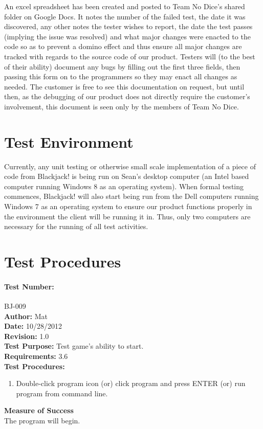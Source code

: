 \documentclass{article}
\begin{document}
An excel spreadsheet has been created and posted to Team No Dice’s shared folder on Google Docs.  It notes the number of the failed test, the date it was discovered, any other notes the tester wishes to report, the date the test passes (implying the issue was resolved) and what major changes were enacted to the code so as to prevent a domino effect and thus ensure all major changes are tracked with regards to the source code of our product.  Testers will (to the best of their ability) document any bugs by filling out the first three fields, then passing this form on to the programmers so they may enact all changes as needed.  The customer is free to see this documentation on request, but until then, as the debugging of our product does not directly require the customer’s involvement, this document is seen only by the members of Team No Dice.  

\section{Test Environment}

Currently, any unit testing or otherwise small scale implementation of a piece of code from Blackjack! is being run on Sean’s desktop computer (an Intel based computer running Windows 8 as an operating system). When formal testing commences, Blackjack! will also start being run from the Dell computers running Windows 7 as an operating system to ensure our product functions properly in the environment the client will be running it in.  Thus, only two computers are necessary for the running of all test activities.  

\section{Test Procedures}

\paragraph{Test Number:} BJ-009\\
\textbf{Author:} Mat\\
\textbf{Date:} 10/28/2012\\
\textbf{Revision:} 1.0\\
\textbf{Test Purpose:} Test game's ability to start.\\
\textbf{Requirements:} 3.6 \\
\textbf{Test Procedures:} 
\begin{enumerate}
\item Double-click program icon (or) click program and press ENTER (or) run program from command line.
\end{enumerate}
\textbf{Measure of Success}\\The program will begin.
\end{document}
